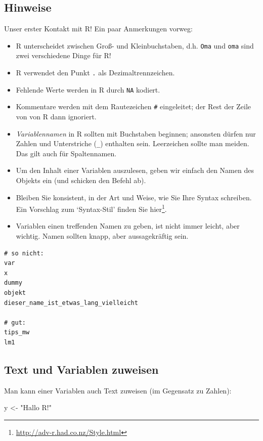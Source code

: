 \documentclass[12pt,ngerman,]{book}
\makeatletter
\newenvironment{Shaded}{\begin{snugshade}}{\end{snugshade}}
\newcommand{\StringTok}[1]{\textcolor[rgb]{0.31,0.60,0.02}{#1}}
\newcommand{\NormalTok}[1]{#1}
\providecommand{\tightlist}{%
  \setlength{\itemsep}{0pt}\setlength{\parskip}{0pt}}
\let\rmarkdownfootnote\footnote%
\def\footnote{\protect\rmarkdownfootnote}
\renewcommand{\href}[2]{#2\footnote{\url{#1}}}
\newenvironment{kframe}{%
\medskip{}
\setlength{\fboxsep}{.8em}
 \def\at@end@of@kframe{}%
 \ifinner\ifhmode%
  \def\at@end@of@kframe{\end{minipage}}%
  \begin{minipage}{\columnwidth}%
 \fi\fi%
 \def\FrameCommand##1{\hskip\@totalleftmargin \hskip-\fboxsep
 \colorbox{shadecolor}{##1}\hskip-\fboxsep
     \hskip-\linewidth \hskip-\@totalleftmargin \hskip\columnwidth}%
 \MakeFramed {\advance\hsize-\width
   \@totalleftmargin\z@ \linewidth\hsize
   \@setminipage}}%
 {\par\unskip\endMakeFramed%
 \at@end@of@kframe}
\renewenvironment{Shaded}{\begin{kframe}}{\end{kframe}}
\theoremstyle{definition}
\theoremstyle{definition}
\theoremstyle{remark}
\makeatother
\begin{document}
\subsection{Hinweise}\label{hinweise-1}

Unser erster Kontakt mit R! Ein paar Anmerkungen vorweg:

\begin{itemize}
\tightlist
\item
  R unterscheidet zwischen Groß- und Kleinbuchstaben, d.h. \texttt{Oma}
  und \texttt{oma} sind zwei verschiedene Dinge für R!
\item
  R verwendet den Punkt \texttt{.} als Dezimaltrennzeichen.
\item
  Fehlende Werte werden in R durch \texttt{NA} kodiert.
\item
  Kommentare werden mit dem Rautezeichen \texttt{\#} eingeleitet; der
  Rest der Zeile von von R dann ignoriert.
\item
  \emph{Variablennamen} in R sollten mit Buchstaben
  beginnen; ansonsten dürfen nur Zahlen und Unterstriche (\texttt{\_})
  enthalten sein. Leerzeichen sollte man meiden. Das gilt auch für
  Spaltennamen.
\item
  Um den Inhalt einer Variablen auszulesen, geben wir einfach den Namen
  des Objekts ein (und schicken den Befehl ab).
\item
  Bleiben Sie konsistent, in der Art und Weise, wie Sie Ihre Syntax
  schreiben. Ein Vorschlag zum `Syntax-Stil' finden Sie
  \href{http://adv-r.had.co.nz/Style.html}{hier}.
\item
  Variablen einen treffenden Namen zu geben, ist nicht immer leicht,
  aber wichtig. Namen sollten knapp, aber aussagekräftig sein.
\end{itemize}

\begin{verbatim}
# so nicht:
var
x
dummy
objekt
dieser_name_ist_etwas_lang_vielleicht

# gut:
tips_mw
lm1
\end{verbatim}

\subsection{Text und Variablen
zuweisen}\label{text-und-variablen-zuweisen}

Man kann einer Variablen auch Text zuweisen (im Gegensatz zu Zahlen):

\begin{Shaded}
\begin{Highlighting}[]
\NormalTok{y <-}\StringTok{ "Hallo R!"}
\end{Highlighting}
\end{Shaded}
\end{document}
